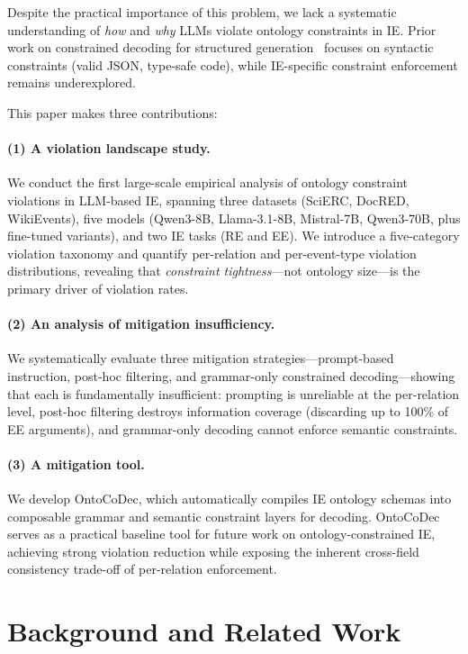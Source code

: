 \documentclass[11pt]{article}
\newcommand{\sys}{OntoCoDec}
\begin{document}
Despite the practical importance of this problem, we lack a systematic understanding of \emph{how} and \emph{why} LLMs violate ontology constraints in IE.
Prior work on constrained decoding for structured generation~\citep{willard2023efficient,zheng2024xgrammar} focuses on syntactic constraints (valid JSON, type-safe code), while IE-specific constraint enforcement remains underexplored.

This paper makes three contributions:

\paragraph{(1) A violation landscape study.}
We conduct the first large-scale empirical analysis of ontology constraint violations in LLM-based IE, spanning three datasets (SciERC, DocRED, WikiEvents), five models (Qwen3-8B, Llama-3.1-8B, Mistral-7B, Qwen3-70B, plus fine-tuned variants), and two IE tasks (RE and EE).
We introduce a five-category violation taxonomy and quantify per-relation and per-event-type violation distributions, revealing that \emph{constraint tightness}---not ontology size---is the primary driver of violation rates.

\paragraph{(2) An analysis of mitigation insufficiency.}
We systematically evaluate three mitigation strategies---prompt-based instruction, post-hoc filtering, and grammar-only constrained decoding---showing that each is fundamentally insufficient: prompting is unreliable at the per-relation level, post-hoc filtering destroys information coverage (discarding up to 100\% of EE arguments), and grammar-only decoding cannot enforce semantic constraints.

\paragraph{(3) A mitigation tool.}
We develop \sys{}, which automatically compiles IE ontology schemas into composable grammar and semantic constraint layers for decoding.
\sys{} serves as a practical baseline tool for future work on ontology-constrained IE, achieving strong violation reduction while exposing the inherent cross-field consistency trade-off of per-relation enforcement.

\section{Background and Related Work}
\label{sec:related}
\end{document}
